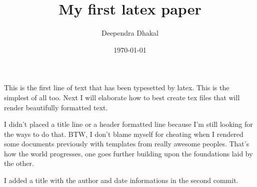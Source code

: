 \documentclass[a4paper,12pt]{article}
\begin{document}
\title{My first latex paper}
\author{Deependra Dhakal}
\date{\today}
\maketitle

This is the first line of text that has been typesetted by latex. This is the simplest of all too. Next I will elaborate how to best create tex files that will render beautifully formatted text.

I didn't placed a title line or a header formatted line because I'm still looking for the ways to do that. BTW, I don't blame myself for cheating when I rendered some documents previously with templates from really awesome peoples. That's how the world progresses, one goes further building upon the foundations laid by the other.

I added a title with the author and date informations in the second commit.
\end{document}
